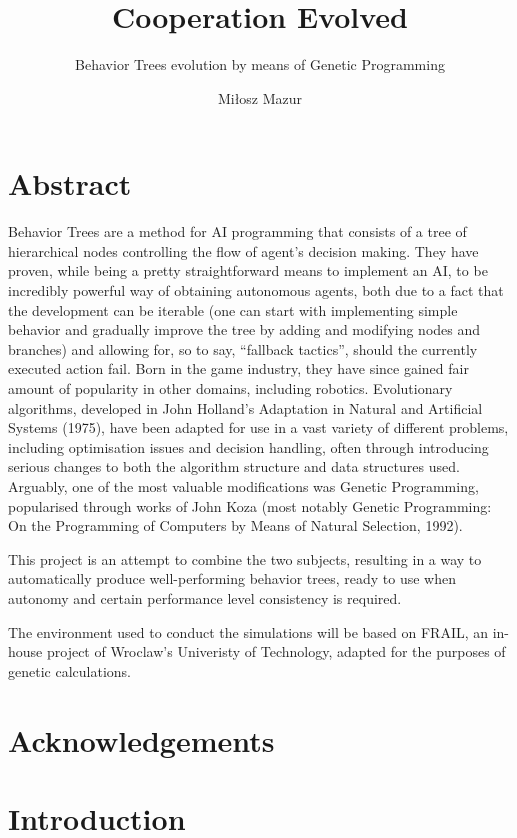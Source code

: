 \documentclass[12pt]{scrreprt}
\begin{document}
\author{Miłosz Mazur}
\title{Cooperation Evolved}
\subtitle{Behavior Trees evolution by means of Genetic Programming}
\maketitle

\newpage
\chapter*{Abstract}
Behavior Trees are a method for AI programming that consists of a tree of hierarchical nodes controlling the flow of agent's decision making. They have proven, while being a pretty straightforward means to implement an AI, to be incredibly powerful way of obtaining autonomous agents, both due to a fact that the development can be iterable (one can start with implementing simple behavior and gradually improve the tree by adding and modifying nodes and branches) and allowing for, so to say, ``fallback tactics'', should the currently executed action fail.  Born in the game industry, they have since gained fair amount of popularity in other domains, including robotics.
Evolutionary algorithms, developed in John Holland’s Adaptation in Natural and Artificial Systems (1975), have been adapted for use in a vast variety of different problems, including optimisation issues and decision handling, often through introducing serious changes to both the algorithm structure and data structures used. Arguably, one of the most valuable modifications was Genetic Programming, popularised through works of John Koza (most notably Genetic Programming: On the Programming of Computers by Means of Natural Selection, 1992).

This project is an attempt to combine the two subjects, resulting in a way to automatically produce well-performing behavior trees, ready to use when autonomy and certain performance level consistency is required.

The environment used to conduct the simulations will be based on FRAIL, an in-house project of Wroclaw's Univeristy of Technology, adapted for the purposes of genetic calculations.

\chapter*{Acknowledgements}
\tableofcontents
\chapter{Introduction}

\end{document}
